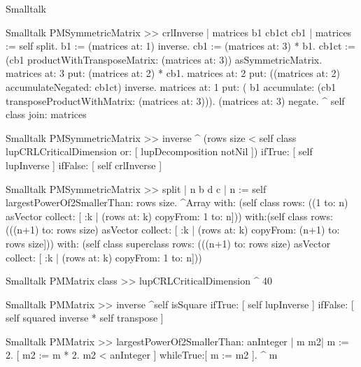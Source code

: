 \begin{displaycode}{Smalltalk}
\begin{displaycode}{Smalltalk}
PMSymmetricMatrix >> crlInverse
    | matrices b1 cb1ct cb1 |
    matrices := self split.
    b1 := (matrices at: 1) inverse.
    cb1 := (matrices at: 3) * b1.
    cb1ct := (cb1 productWithTransposeMatrix: (matrices at: 3)) 
                asSymmetricMatrix.
    matrices at: 3 put: (matrices at: 2) * cb1.
    matrices at: 2 put: ((matrices at: 2) accumulateNegated: cb1ct) 
                                                              inverse.
    matrices at: 1 put: ( b1 accumulate: (cb1 
                       transposeProductWithMatrix: (matrices at: 3))).
    (matrices at: 3) negate.
    ^ self class join: matrices
\end{displaycode}

\begin{displaycode}{Smalltalk}
PMSymmetricMatrix >> inverse
    ^ (rows size < self class lupCRLCriticalDimension or: 
                                           [ lupDecomposition notNil ]) 
            ifTrue: [ self lupInverse ]
            ifFalse: [ self crlInverse ]
\end{displaycode}

\begin{displaycode}{Smalltalk}
PMSymmetricMatrix >> split
    | n b d c |
    n := self largestPowerOf2SmallerThan: rows size.
    ^Array with: (self class rows: ((1 to: n) asVector collect: [ 
                               :k | (rows at: k) copyFrom: 1 to: n]))
              with:(self class rows: (((n+1) to: rows size) 
      asVector collect: [ :k | (rows at: k) copyFrom: (n+1) to: rows 
      size]))
              with: (self class superclass rows: (((n+1) to: rows 
     size) asVector collect: [ :k | (rows at: k) copyFrom: 1 to: n]))
\end{displaycode}

\begin{displaycode}{Smalltalk}
PMMatrix class >> lupCRLCriticalDimension
    ^ 40
\end{displaycode}

\begin{displaycode}{Smalltalk}
PMMatrix >> inverse
    ^self isSquare 
        ifTrue: [ self lupInverse ]
        ifFalse: [ self squared inverse * self transpose ]
\end{displaycode}

\begin{displaycode}{Smalltalk}
PMMatrix >> largestPowerOf2SmallerThan: anInteger
    | m m2|
    m := 2.
    [ m2 := m * 2.
      m2 < anInteger ] whileTrue:[ m := m2 ].
    ^ m
\end{displaycode}


\end{displaycode}
